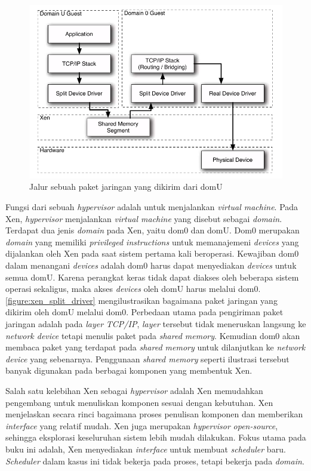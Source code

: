 \begin{figure}[!ht]
    \includegraphics[scale=0.5]{./resources/xen-split-driver.png}
    \caption[Jalur sebuah paket jaringan yang dikirim dari domU]{Jalur sebuah paket jaringan yang dikirim dari domU \citep{Chisnall2014}}
    \label{figure:xen_split_driver}
\end{figure}

Fungsi dari sebuah \textit{hypervisor} adalah untuk menjalankan \textit{virtual machine}.  Pada
Xen, \textit{hypervisor} menjalankan \textit{virtual machine} yang disebut sebagai
\textit{domain}.  Terdapat dua jenis \textit{domain} pada Xen, yaitu dom0 dan domU.  Dom0
merupakan \textit{domain} yang memiliki \textit{privileged instructions} untuk memanajemeni
\textit{devices} yang dijalankan oleh Xen pada saat sistem pertama kali beroperasi.  Kewajiban
dom0 dalam menangani \textit{devices} adalah dom0 harus dapat menyediakan \textit{devices} untuk
semua domU.  Karena perangkat keras tidak dapat diakses oleh beberapa sistem operasi sekaligus,
maka akses \textit{devices} oleh domU harus melalui dom0.  \autoref{figure:xen_split_driver}
mengilustrasikan bagaimana paket jaringan yang dikirim oleh domU melalui dom0.  Perbedaan utama
pada pengiriman paket jaringan adalah pada \textit{layer} \textit{TCP/IP}, \textit{layer}
tersebut tidak meneruskan langsung ke \textit{network device} tetapi menulis paket pada
\textit{shared memory}.  Kemudian dom0 akan membaca paket yang terdapat pada \textit{shared
memory} untuk dilanjutkan ke \textit{network device} yang sebenarnya.  Penggunaan \textit{shared
memory} seperti ilustrasi tersebut banyak digunakan pada berbagai komponen yang membentuk Xen.

Salah satu kelebihan Xen sebagai \textit{hypervisor} adalah Xen memudahkan pengembang untuk
menuliskan komponen sesuai dengan kebutuhan.  Xen menjelaskan secara rinci bagaimana proses
penulisan komponen dan memberikan \textit{interface} yang relatif mudah.  Xen juga merupakan
\textit{hypervisor} \textit{open-source}, sehingga eksplorasi keseluruhan sistem lebih mudah
dilakukan.  Fokus utama pada buku ini adalah, Xen menyediakan \textit{interface} untuk membuat
\textit{scheduler} baru.  \textit{Scheduler} dalam kasus ini tidak bekerja pada proses,
tetapi bekerja pada \textit{domain}.

